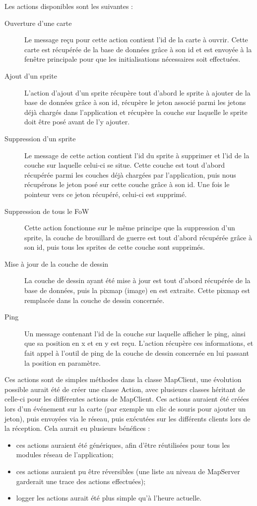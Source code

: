 Les actions disponibles sont les suivantes :
\begin{description}
	\item[Ouverture d'une carte] Le message reçu pour cette action contient l'id de la carte à ouvrir. Cette carte est récupérée de la base de données grâce à son id et est envoyée à la fenêtre principale pour que les initialisations nécessaires soit effectuées.
	\item[Ajout d'un sprite] L'action d'ajout d'un sprite récupère tout d'abord le sprite à ajouter de la base de données grâce à son id, récupère le jeton associé parmi les jetons déjà chargés dans l'application et récupère la couche sur laquelle le sprite doit être posé avant de l'y ajouter.
	\item[Suppression d'un sprite] Le message de cette action contient l'id du sprite à supprimer et l'id de la couche sur laquelle celui-ci se situe. Cette couche est tout d'abord récupérée parmi les couches déjà chargées par l'application, puis nous récupérons le jeton posé sur cette couche grâce à son id. Une fois le pointeur vers ce jeton récupéré, celui-ci est supprimé.
	\item[Suppression de tous le FoW] Cette action fonctionne sur le même principe que la suppression d'un sprite, la couche de brouillard de guerre est tout d'abord récupérée grâce à son id, puis tous les sprites de cette couche sont supprimés.
	\item[Mise à jour de la couche de dessin] La couche de dessin ayant été mise à jour est tout d'abord récupérée de la base de données, puis la pixmap (image) en est extraite. Cette pixmap est remplacée dans la couche de dessin concernée.
	\item[Ping] Un message contenant l'id de la couche sur laquelle afficher le ping, ainsi que sa position en x et en y est reçu. L'action récupère ces informations, et fait appel à l'outil de ping de la couche de dessin concernée en lui passant la position en paramètre.
\end{description}
\bigskip

Ces actions sont de simples méthodes dans la classe MapClient, une évolution possible aurait été de créer une classe Action, avec plusieurs classes héritant de celle-ci pour les différentes actions de MapClient. Ces actions auraient été créées lors d'un événement sur la carte (par exemple un clic de souris pour ajouter un jeton), puis envoyées via le réseau, puis exécutées sur les différents clients lors de la réception. Cela aurait eu plusieurs bénéfices : 
\begin{itemize}
	\item ces actions auraient été génériques, afin d'être réutilisées pour tous les modules réseau de l'application;
	\item ces actions auraient pu être réversibles (une liste au niveau de MapServer garderait une trace des actions effectuées);
	\item logger les actions aurait été plus simple qu'à l'heure actuelle.
\end{itemize}
\bigskip

